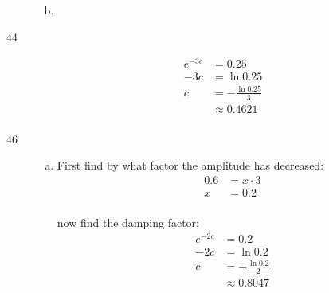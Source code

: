 \documentclass{exam}
\begin{document}
\begin{description}
\begin{enumerate}[(a)]
\begin{itemize*}
            \end{itemize*}

          \item 
        \end{enumerate}

      \item[44]
        \begin{align*}
          e^{-3c} & = 0.25 \\
          -3c     & = \ln 0.25 \\
          c       & = - \frac{\ln 0.25}{3} \\
                  & \approx \boxed{ 0.4621 } \\
        \end{align*}

      \pagebreak

      \item[46]
        \begin{enumerate}[(a)]
          \item 
            First find by what factor the amplitude has decreased:
            \begin{align*}
              0.6 & = x \cdot 3 \\
              x   & = 0.2 \\
            \end{align*}

            now find the damping factor:
            \begin{align*}
              e^{-2c} & = 0.2 \\
              -2c     & = \ln 0.2 \\
              c       & = - \frac{\ln 0.2}{2} \\
                      & \approx \boxed{ 0.8047 } \\
            \end{align*}


\end{enumerate}
\end{description}
\end{document}

